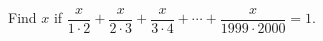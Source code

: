 Find $x$ if $\dfrac{x}{1\cdot2}+\dfrac{x}{2\cdot3}+\dfrac{x}{3\cdot4}+\cdots+\dfrac{x}{1999\cdot2000}=1$.
